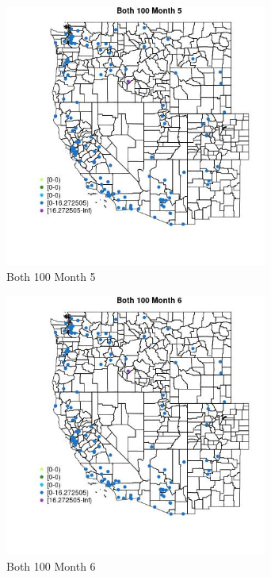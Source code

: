 \begin{figure} 
\centering  
\includegraphics[width=0.77\textwidth]{Code_Outputs/Report_ML_input_PM25_Step4_part_e_de_duplicated_aves_MapObsMo5Both_100.jpg} 
\caption{\label{fig:Report_ML_input_PM25_Step4_part_e_de_duplicated_avesMapObsMo5Both_100}Both 100 Month 5} 
\end{figure} 
 

\begin{figure} 
\centering  
\includegraphics[width=0.77\textwidth]{Code_Outputs/Report_ML_input_PM25_Step4_part_e_de_duplicated_aves_MapObsMo6Both_100.jpg} 
\caption{\label{fig:Report_ML_input_PM25_Step4_part_e_de_duplicated_avesMapObsMo6Both_100}Both 100 Month 6} 
\end{figure} 
 

